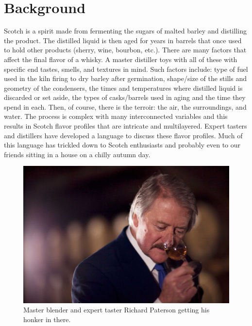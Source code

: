 \documentclass{article}
\begin{document}
	\section{Background}
	 
	 Scotch is a spirit made from fermenting the sugars of malted barley and distilling the product. The distilled liquid is then aged for years in barrels that once used to hold other products (sherry, wine, bourbon, etc.). There are many factors that affect the final flavor of a whisky. A master distiller toys with all of these with specific end tastes, smells, and textures in mind. Such factors include: type of fuel used in the kiln firing to dry barley after germination, shape/size of the stills and geometry of the condensers, the times and temperatures where distilled liquid is discarded or set aside, the types of casks/barrels used in aging and the time they spend in each. Then, of course, there is the terroir: the air, the surroundings, and water. The process is complex with many interconnected variables and this results in Scotch flavor profiles that are intricate and multilayered.
	 Expert tasters and distillers have developed a language to discuss these flavor profiles. Much of this language has trickled down to Scotch enthusiasts and probably even to our friends sitting in a house on a chilly autumn day.
	 \begin{figure}[H]
		\begin{center}
			\includegraphics[totalheight=6cm]{figures/richpaterson_expert.jpg}
		\end{center}
		\caption{Master blender and expert taster Richard Paterson getting his honker in there.}
	\end{figure}
	 
\end{document}
